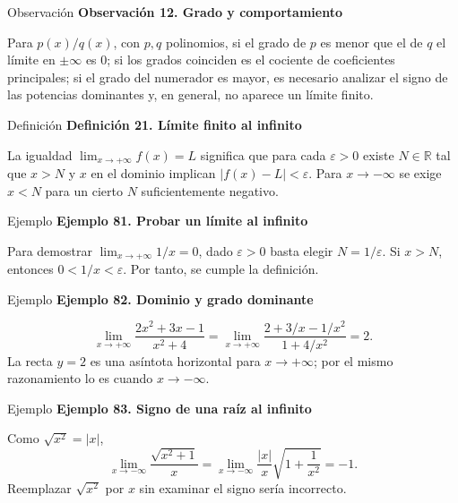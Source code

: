 \documentclass[12pt,aspectratio=169]{beamer}
\newcommand{\R}{\mathbb{R}}
\begin{document}
\begin{frame}[t,allowframebreaks]{Observación}
{\color{azul}\bfseries Observación 12. Grado y comportamiento}\par\medskip

Para $p(x)/q(x)$, con $p,q$ polinomios, si el grado de $p$ es menor que el de $q$ el límite en $\pm\infty$ es $0$; si los grados coinciden es el cociente de coeficientes principales; si el grado del numerador es mayor, es necesario analizar el signo de las potencias dominantes y, en general, no aparece un límite finito.
\end{frame}


\begin{frame}[t,allowframebreaks]{Definición}
{\color{azul}\bfseries Definición 21. Límite finito al infinito}\par\medskip

La igualdad $\lim_{x\to+\infty}f(x)=L$ significa que para cada $\varepsilon>0$ existe $N\in\R$ tal que $x>N$ y $x$ en el dominio implican $|f(x)-L|<\varepsilon$. Para $x\to-\infty$ se exige $x<N$ para un cierto $N$ suficientemente negativo.
\end{frame}


\begin{frame}[t,allowframebreaks]{Ejemplo}
{\color{azul}\bfseries Ejemplo 81. Probar un límite al infinito}\par\medskip

Para demostrar $\lim_{x\to+\infty}1/x=0$, dado $\varepsilon>0$ basta elegir $N=1/\varepsilon$. Si $x>N$, entonces $0<1/x<\varepsilon$. Por tanto, se cumple la definición.
\end{frame}


\begin{frame}[t,allowframebreaks]{Ejemplo}
{\color{azul}\bfseries Ejemplo 82. Dominio y grado dominante}\par\medskip

\[
 \lim_{x\to+\infty}\frac{2x^2+3x-1}{x^2+4}
 =\lim_{x\to+\infty}\frac{2+3/x-1/x^2}{1+4/x^2}=\boxed2.
\]
La recta $y=2$ es una asíntota horizontal para $x\to+\infty$; por el mismo razonamiento lo es cuando $x\to-\infty$.
\end{frame}


\begin{frame}[t,allowframebreaks]{Ejemplo}
{\color{azul}\bfseries Ejemplo 83. Signo de una raíz al infinito}\par\medskip

Como $\sqrt{x^2}=|x|$,
\[
 \lim_{x\to-\infty}\frac{\sqrt{x^2+1}}x
 =\lim_{x\to-\infty}\frac{|x|}{x}\sqrt{1+\frac1{x^2}}
 =\boxed{-1}.
\]
Reemplazar $\sqrt{x^2}$ por $x$ sin examinar el signo sería incorrecto.
\end{frame}
\end{document}
